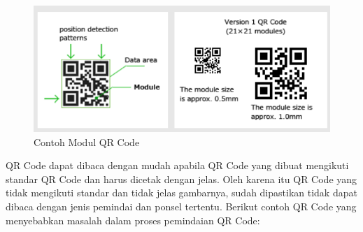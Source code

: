 \begin{figure}[H]
	\centering
	\includegraphics[scale=1]{Gambar/modulSize.png}
	\caption{Contoh Modul QR Code} 
	\label{fig:modulSize}
\end{figure}

QR Code dapat dibaca dengan mudah apabila QR Code yang dibuat mengikuti standar QR Code dan harus dicetak dengan jelas. Oleh karena itu QR Code yang tidak mengikuti standar dan tidak jelas gambarnya, sudah dipastikan tidak dapat dibaca dengan jenis pemindai dan ponsel tertentu. Berikut contoh QR Code yang menyebabkan masalah dalam proses pemindaian QR Code:

